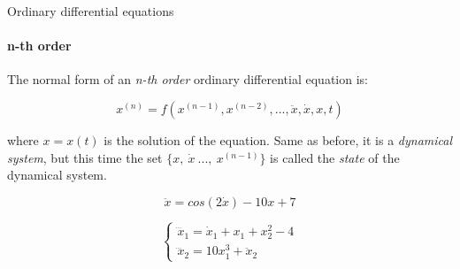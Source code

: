 \documentclass{beamer}
\begin{document}
\begin{frame}{Ordinary differential equations}
\framesubtitle{n-th order}
\begin{flushleft}

The normal form of an \emph{n-th order} ordinary differential equation is:

\begin{equation}
    x^{(n)} = f (x^{(n-1)}, x^{(n-2)}, ..., \ddot{x}, \dot{x}, x, t)
\end{equation}

where $x = x(t)$ is the solution of the equation. Same as before, it is a \emph{dynamical system}, but this time the set $\{ x, \ \dot{x} \ ..., \ x^{(n-1)} \}$ is called the \emph{state} of the dynamical system.

\begin{example}
\begin{equation}
    \ddot{x} = cos(2\dot{x}) - 10 x + 7 
\end{equation}
\end{example}


\begin{example}
\begin{equation}
\begin{cases}
    \dddot{x}_1 = \dot{x}_1 + x_1 + x_2^2 - 4 \\
    \dddot{x}_2 = 10 x_1^3 + \ddot{x}_2
\end{cases}
\end{equation}
\end{example}

\end{flushleft}
\end{frame}
\end{document}

